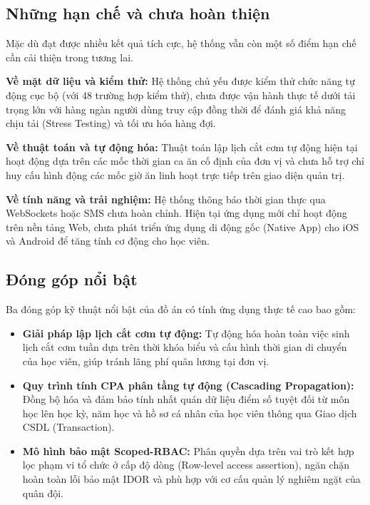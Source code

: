 \documentclass[../DoAn.tex]{subfiles}
\begin{document}
\subsection{Những hạn chế và chưa hoàn thiện}
Mặc dù đạt được nhiều kết quả tích cực, hệ thống vẫn còn một số điểm hạn chế cần cải thiện trong tương lai.
\par
\textbf{Về mặt dữ liệu và kiểm thử:} Hệ thống chủ yếu được kiểm thử chức năng tự động cục bộ (với 48 trường hợp kiểm thử), chưa được vận hành thực tế dưới tải trọng lớn với hàng ngàn người dùng truy cập đồng thời để đánh giá khả năng chịu tải (Stress Testing) và tối ưu hóa hàng đợi.
\par
\textbf{Về thuật toán và tự động hóa:} Thuật toán lập lịch cắt cơm tự động hiện tại hoạt động dựa trên các mốc thời gian ca ăn cố định của đơn vị và chưa hỗ trợ chỉ huy cấu hình động các mốc giờ ăn linh hoạt trực tiếp trên giao diện quản trị.
\par
\textbf{Về tính năng và trải nghiệm:} Hệ thống thông báo thời gian thực qua WebSockets hoặc SMS chưa hoàn chỉnh. Hiện tại ứng dụng mới chỉ hoạt động trên nền tảng Web, chưa phát triển ứng dụng di động gốc (Native App) cho iOS và Android để tăng tính cơ động cho học viên.

\subsection{Đóng góp nổi bật}
Ba đóng góp kỹ thuật nổi bật của đồ án có tính ứng dụng thực tế cao bao gồm:
\begin{itemize}
    \item \textbf{Giải pháp lập lịch cắt cơm tự động:} Tự động hóa hoàn toàn việc sinh lịch cắt cơm tuần dựa trên thời khóa biểu và cấu hình thời gian di chuyển của học viên, giúp tránh lãng phí quân lương tại đơn vị.
    \item \textbf{Quy trình tính CPA phân tầng tự động (Cascading Propagation):} Đồng bộ hóa và đảm bảo tính nhất quán dữ liệu điểm số tuyệt đối từ môn học lên học kỳ, năm học và hồ sơ cá nhân của học viên thông qua Giao dịch CSDL (Transaction).
    \item \textbf{Mô hình bảo mật Scoped-RBAC:} Phân quyền dựa trên vai trò kết hợp lọc phạm vi tổ chức ở cấp độ dòng (Row-level access assertion), ngăn chặn hoàn toàn lỗi bảo mật IDOR và phù hợp với cơ cấu quản lý nghiêm ngặt của quân đội.
\end{itemize}
\end{document}
